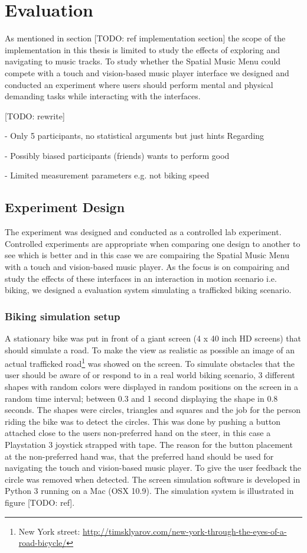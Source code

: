\chapter{Evaluation}
\label{sec:evaluation}
As mentioned in section [TODO: ref implementation section] the scope of the implementation in this thesis is limited to study the effects of exploring and navigating to music tracks. To study whether the Spatial Music Menu could compete with a touch and vision-based music player interface we designed and conducted an experiment where users should perform mental and physical demanding tasks while interacting with the interfaces.

[TODO: rewrite]

- Only 5 participants, no statistical arguments but just hints
Regarding

- Possibly biased participants (friends) wants to perform good

- Limited measurement parameters e.g. not biking speed


\section{Experiment Design}
The experiment was designed and conducted as a controlled lab experiment. Controlled experiments are appropriate when comparing one design to another to see which is better \cite{benyon_designing_2010} and in this case we are compairing the Spatial Music Menu with a touch and vision-based music player. As the focus is on compairing and study the effects of these interfaces in an interaction in motion scenario i.e. biking, we designed a evaluation system simulating a trafficked biking scenario.

\subsection{Biking simulation setup}
A stationary bike was put in front of a giant screen (4 x 40 inch HD screens) that should simulate a road. To make the view as realistic as possible an image of an actual trafficked road\footnote{New York street: \url{http://timsklyarov.com/new-york-through-the-eyes-of-a-road-bicycle/}} was showed on the screen. To simulate obstacles that the user should be aware of or respond to in a real world biking scenario, 3 different shapes with random colors were displayed in random positions on the screen in a random time interval; between 0.3 and 1 second displaying the shape in 0.8 seconds. The shapes were circles, triangles and squares and the job for the person riding the bike was to detect the circles. This was done by pushing a button attached close to the users non-preferred hand on the steer, in this case a Playstation 3 joystick strapped with tape. The reason for the button placement at the non-preferred hand was, that the preferred hand should be used for navigating the touch and vision-based music player. To give the user feedback the circle was removed when detected. The screen simulation software is developed in Python 3 running on a Mac (OSX 10.9). The simulation system is illustrated in figure [TODO: ref].

